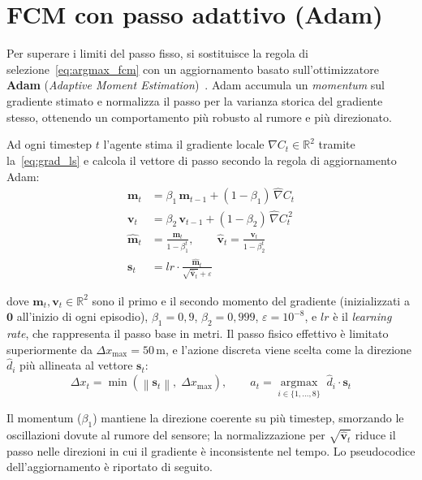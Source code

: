 \section{FCM con passo adattivo (Adam)}
\label{sec:fcm_adam}

Per superare i limiti del passo fisso, si sostituisce la regola di
selezione~\eqref{eq:argmax_fcm} con un aggiornamento basato sull'ottimizzatore
\textbf{Adam} (\emph{Adaptive Moment Estimation})~\citep{adam}. Adam accumula un
\emph{momentum} sul gradiente stimato e normalizza il passo per la varianza storica
del gradiente stesso, ottenendo un comportamento pi\`u robusto al rumore e pi\`u
direzionato.

Ad ogni timestep $t$ l'agente stima il gradiente locale
$\hat{\nabla}C_t \in \mathbb{R}^2$ tramite la~\eqref{eq:grad_ls} e calcola il
vettore di passo secondo la regola di aggiornamento Adam:
\begin{align}
    \mathbf{m}_t &= \beta_1\,\mathbf{m}_{t-1} + (1-\beta_1)\,\hat{\nabla}C_t \\
    \mathbf{v}_t &= \beta_2\,\mathbf{v}_{t-1} + (1-\beta_2)\,\hat{\nabla}C_t^{\,2} \\
    \hat{\mathbf{m}}_t &= \frac{\mathbf{m}_t}{1-\beta_1^t}, \qquad
    \hat{\mathbf{v}}_t = \frac{\mathbf{v}_t}{1-\beta_2^t} \\[4pt]
    \mathbf{s}_t &= lr \cdot \frac{\hat{\mathbf{m}}_t}{\sqrt{\hat{\mathbf{v}}_t} + \varepsilon}
    \label{eq:adam_step}
\end{align}

dove $\mathbf{m}_t, \mathbf{v}_t \in \mathbb{R}^2$ sono il primo e il secondo momento
del gradiente (inizializzati a $\mathbf{0}$ all'inizio di ogni episodio),
$\beta_1 = 0{,}9$, $\beta_2 = 0{,}999$, $\varepsilon = 10^{-8}$, e $lr$ \`e il
\emph{learning rate}, che rappresenta il passo base in metri. Il passo fisico effettivo
\`e limitato superiormente da $\Delta x_{\max} = 50\,\text{m}$, e l'azione discreta
viene scelta come la direzione $\hat{d}_i$ pi\`u allineata al vettore $\mathbf{s}_t$:
\begin{equation}
    \Delta x_t = \min\!\left(\left\|\mathbf{s}_t\right\|,\; \Delta x_{\max}\right),
    \qquad
    a_t = \operatorname*{argmax}_{i \in \{1,\ldots,8\}} \; \hat{d}_i \cdot \mathbf{s}_t
\end{equation}

Il momentum ($\beta_1$) mantiene la direzione coerente su pi\`u timestep, smorzando
le oscillazioni dovute al rumore del sensore; la normalizzazione per
$\sqrt{\hat{\mathbf{v}}_t}$ riduce il passo nelle direzioni in cui il gradiente \`e
inconsistente nel tempo. Lo pseudocodice dell'aggiornamento \`e riportato di seguito.

